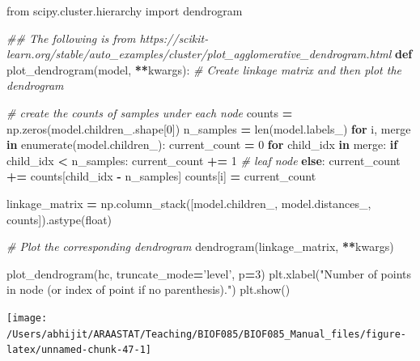 \documentclass[
  letterpaper,
]{scrbook}
\newenvironment{Shaded}{\begin{snugshade}}{\end{snugshade}}
\newcommand{\BuiltInTok}[1]{#1}
\newcommand{\CommentTok}[1]{\textcolor[rgb]{0.56,0.35,0.01}{\textit{#1}}}
\newcommand{\ControlFlowTok}[1]{\textcolor[rgb]{0.13,0.29,0.53}{\textbf{#1}}}
\newcommand{\DecValTok}[1]{\textcolor[rgb]{0.00,0.00,0.81}{#1}}
\newcommand{\ImportTok}[1]{#1}
\newcommand{\KeywordTok}[1]{\textcolor[rgb]{0.13,0.29,0.53}{\textbf{#1}}}
\newcommand{\NormalTok}[1]{#1}
\newcommand{\OperatorTok}[1]{\textcolor[rgb]{0.81,0.36,0.00}{\textbf{#1}}}
\newcommand{\StringTok}[1]{\textcolor[rgb]{0.31,0.60,0.02}{#1}}
\begin{document}
\begin{Shaded}
\begin{Highlighting}[]
\ImportTok{from}\NormalTok{ scipy.cluster.hierarchy }\ImportTok{import}\NormalTok{ dendrogram}

\CommentTok{## The following is from https://scikit-learn.org/stable/auto_examples/cluster/plot_agglomerative_dendrogram.html}
\KeywordTok{def}\NormalTok{ plot_dendrogram(model, }\OperatorTok{**}\NormalTok{kwargs):}
    \CommentTok{# Create linkage matrix and then plot the dendrogram}

    \CommentTok{# create the counts of samples under each node}
\NormalTok{    counts }\OperatorTok{=}\NormalTok{ np.zeros(model.children_.shape[}\DecValTok{0}\NormalTok{])}
\NormalTok{    n_samples }\OperatorTok{=} \BuiltInTok{len}\NormalTok{(model.labels_)}
    \ControlFlowTok{for}\NormalTok{ i, merge }\KeywordTok{in} \BuiltInTok{enumerate}\NormalTok{(model.children_):}
\NormalTok{        current_count }\OperatorTok{=} \DecValTok{0}
        \ControlFlowTok{for}\NormalTok{ child_idx }\KeywordTok{in}\NormalTok{ merge:}
            \ControlFlowTok{if}\NormalTok{ child_idx }\OperatorTok{<}\NormalTok{ n_samples:}
\NormalTok{                current_count }\OperatorTok{+=} \DecValTok{1}  \CommentTok{# leaf node}
            \ControlFlowTok{else}\NormalTok{:}
\NormalTok{                current_count }\OperatorTok{+=}\NormalTok{ counts[child_idx }\OperatorTok{-}\NormalTok{ n_samples]}
\NormalTok{        counts[i] }\OperatorTok{=}\NormalTok{ current_count}

\NormalTok{    linkage_matrix }\OperatorTok{=}\NormalTok{ np.column_stack([model.children_, model.distances_,}
\NormalTok{                                      counts]).astype(}\BuiltInTok{float}\NormalTok{)}

    \CommentTok{# Plot the corresponding dendrogram}
\NormalTok{    dendrogram(linkage_matrix, }\OperatorTok{**}\NormalTok{kwargs)}

\NormalTok{plot_dendrogram(hc, truncate_mode}\OperatorTok{=}\StringTok{'level'}\NormalTok{, p}\OperatorTok{=}\DecValTok{3}\NormalTok{)}
\NormalTok{plt.xlabel(}\StringTok{"Number of points in node (or index of point if no parenthesis)."}\NormalTok{)}
\NormalTok{plt.show()}
\end{Highlighting}
\end{Shaded}

\begin{center}\texttt{[image: /Users/abhijit/ARAASTAT/Teaching/BIOF085/BIOF085\_Manual\_files/figure-latex/unnamed-chunk-47-1]} \end{center}
\end{document}
